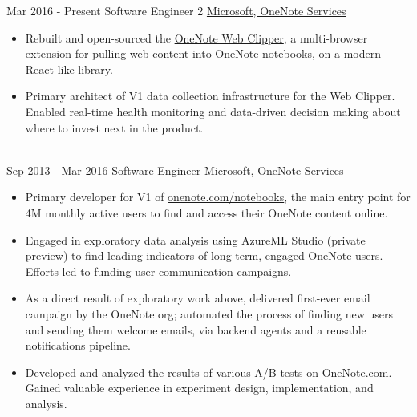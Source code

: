 \documentclass[letterpaper]{twentysecondcv} %
\begin{document}
\begin{twenty} %
\twentyitem
    	{Mar 2016 -}
		{Present}
        {Software Engineer 2}
        {\href{http://www.onenote.com/}{Microsoft, OneNote Services}}
        {}
        {
        {\begin{itemize} \itemsep -2pt %
        \item Rebuilt and open-sourced the \href{https://github.com/OneNoteDev/WebClipper/wiki}{OneNote Web Clipper}, a multi-browser extension for pulling web content into OneNote notebooks, on a modern React-like library.
        \item Primary architect of V1 data collection infrastructure for the Web Clipper. Enabled real-time health monitoring and data-driven decision making about where to invest next in the product.
    \end{itemize}}
        }
    \\
	\twentyitem
    	{Sep 2013 -}
		{Mar 2016}
        {Software Engineer}
        {\href{http://www.onenote.com/}{Microsoft, OneNote Services}}
        {}
        {
        {\begin{itemize} \itemsep -2pt %
        \item Primary developer for V1 of \href{https://www.onenote.com/notebooks}{onenote.com/notebooks}, the main entry point for 4M monthly active users to find and access their OneNote content online.
        \item Engaged in exploratory data analysis using AzureML Studio (private preview) to find leading indicators of long-term, engaged OneNote users. Efforts led to funding user communication campaigns.
        \item As a direct result of exploratory work above, delivered first-ever email campaign by the OneNote org; automated the process of finding new users and sending them welcome emails, via backend agents and a reusable notifications pipeline.
        \item Developed and analyzed the results of various A/B tests on OneNote.com. Gained valuable experience in experiment design, implementation, and analysis.
    \end{itemize}}
        }

\end{twenty}

\end{document}
